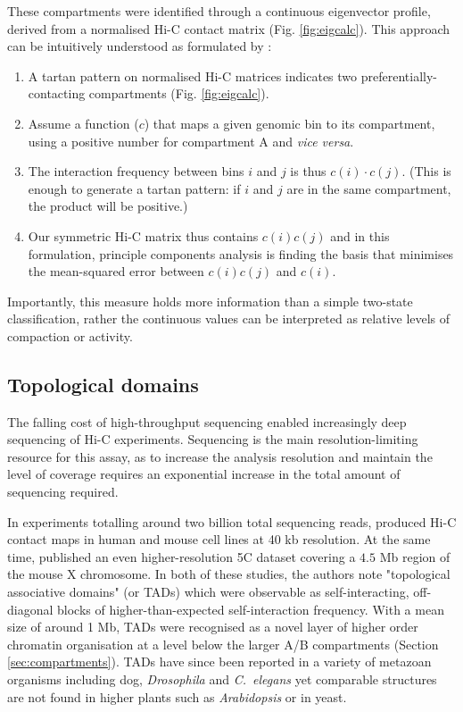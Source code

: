 \documentclass[a4paper,11pt,oneside]{book}
\begin{document}
These compartments were identified through a continuous eigenvector profile, derived from a normalised Hi-C contact matrix\cite{Lieberman2009} (Fig. \ref{fig:eigcalc}). This approach can be intuitively understood as formulated by \citet{Lajoie2014}:
\begin{enumerate}
\item A tartan pattern on normalised Hi-C matrices indicates two preferentially-contacting compartments (Fig. \ref{fig:eigcalc}).
\item Assume a function ($c$) that maps a given genomic bin to its compartment, using a positive number for compartment A and \emph{vice versa}.
\item The interaction frequency between bins $i$ and $j$ is thus $c(i)\cdot c(j)$. (This is enough to generate a tartan pattern: if $i$ and $j$ are in the same compartment, the product will be positive.\cite{Lajoie2014})
\item Our symmetric Hi-C matrix thus contains $c(i)c(j)$ and in this formulation, principle components analysis is finding the basis that minimises the mean-squared error between $c(i)c(j)$ and $c(i)$.
\end{enumerate}
Importantly, this measure holds more information than a simple two-state classification, rather the continuous values can be interpreted as relative levels of compaction or activity.\cite{Dekker2013, Imakaev2012}

\subsection{Topological domains}\label{intro:tads}

The falling cost of high-throughput sequencing enabled increasingly deep sequencing of Hi-C experiments. Sequencing is the main resolution-limiting resource for this assay, as to increase the analysis resolution and maintain the level of coverage requires an exponential increase in the total amount of sequencing required.\cite{Lieberman2009, Tanay2013}

In experiments totalling around two billion total sequencing reads, \citet{Dixon2012} produced Hi-C contact maps in human and mouse cell lines at 40 kb resolution. At the same time, \citet{Nora2012} published an even higher-resolution 5C dataset covering a $4.5$ Mb region of the mouse X chromosome. In both of these studies, the authors note "topological associative domains" (or TADs) which were observable as self-interacting, off-diagonal blocks of higher-than-expected self-interaction frequency. With a mean size of around 1 Mb, TADs were recognised as a novel layer of higher order chromatin organisation at a level below the larger A/B compartments (Section \ref{sec:compartments}). TADs have since been reported in a variety of metazoan organisms including dog,\cite{VietriRudan2015} \emph{Drosophila}\cite{Sexton2012, Hou2012} and \emph{C.~elegans}\cite{Crane2015} yet comparable structures are not found in higher plants such as \emph{Arabidopsis}\cite{Feng2014, Wang2015} or in yeast.\cite{Duan2010, Gong2015}
\end{document}
